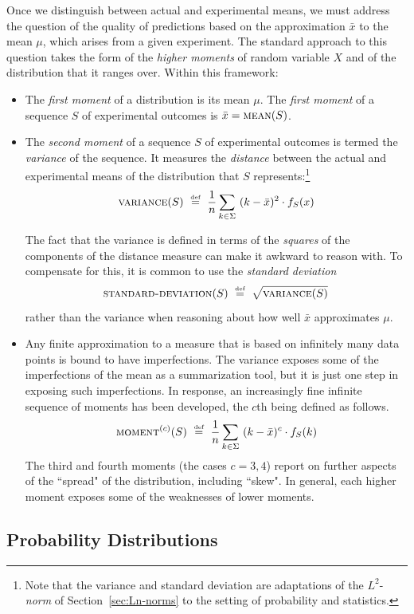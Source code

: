 Once we distinguish between actual and experimental means, we must address the question of the quality of predictions based on the approximation $\bar{x}$ to the mean $\mu$, which arises from a given experiment.  The standard approach to this question takes the form of the {\em higher moments} of random variable $X$ and of the distribution that it ranges over.  Within this framework:
\begin{itemize}
\item
The {\em first moment} of a distribution is its mean $\mu$.  The  {\em first moment} of a sequence $S$ of experimental outcomes is $\bar{x}  =  \mbox{\sc mean}(S)$.
\item
The {\em second moment} of a sequence $S$ of experimental outcomes is termed the {\it variance} of the sequence.   It measures the {\em distance} between the actual and experimental means of the distribution that $S$ represents:\footnote{Note that the variance and standard deviation are adaptations of the $L^2$-{\it norm} of Section~\ref{sec:Ln-norms} to the setting of probability and statistics.}
\[  \mbox{\sc variance}(S) \ \stackrel{\mbox{{\tiny def}}}{=} \ {1 \over n} \sum_{k \in \Sigma} \ (k - \bar{x})^2 \cdot f_S(x) \]

The fact that the variance is defined in terms of the {\em squares} of the components of the distance measure can make it awkward to reason with.  To compensate for this, it is common to use the {\it standard deviation}
\[ \mbox{\sc standard-deviation}(S) \ \eqdef \ \sqrt{\mbox{\sc variance}(S)} \]
rather than the variance when reasoning about how well $\bar{x}$ approximates $\mu$.

\item
Any finite approximation to a measure that is based on infinitely many data points is bound to have imperfections.  The variance exposes some of the imperfections of the mean as a summarization tool, but it is just one step in exposing such imperfections.  In response, an increasingly fine infinite sequence of moments has been developed, the $c$th being defined as follows.
\[
\mbox{\sc moment}^{(c)}(S) \ \stackrel{\mbox{{\tiny def}}}{=} \ {1 \over n} \sum_{k \in \Sigma} \ (k - \bar{x})^c \cdot f_S(k)
\]
The third and fourth moments (the cases $c = 3,4$) report on further aspects of the ``spread" of the distribution, including ``skew".  In general, each higher moment exposes some of the weaknesses of lower moments.
\end{itemize}


\subsection{Probability Distributions}
\label{sec:prob-distr}

